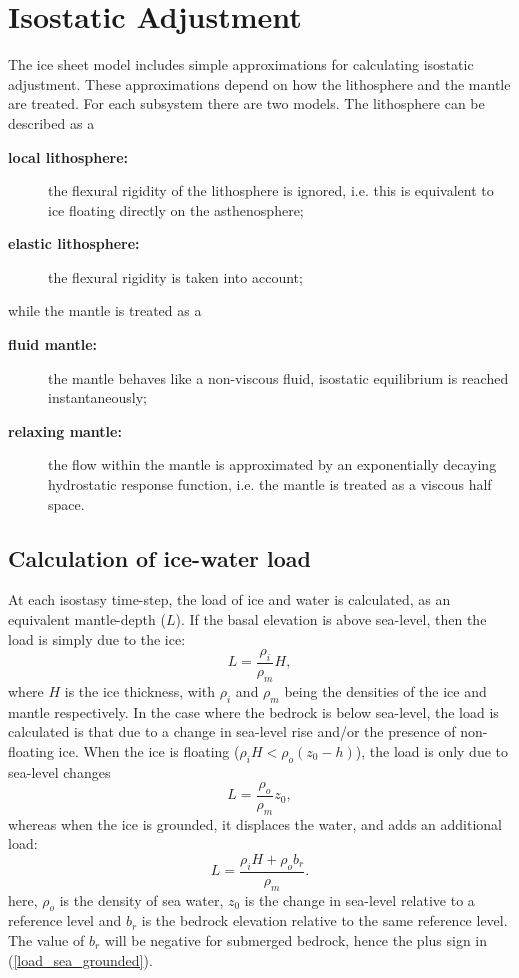 \section{Isostatic Adjustment}
The ice sheet model includes simple approximations for calculating isostatic adjustment. These approximations depend on how the lithosphere and the mantle are treated. For each subsystem there are two models. The lithosphere can be described as a
\begin{description}
\item[\textbf{local lithosphere:}] the flexural rigidity of the lithosphere is ignored, i.e. this is equivalent to ice floating directly on the asthenosphere;
\item[\textbf{elastic lithosphere:}] the flexural rigidity is taken into account;
\end{description}
while the mantle is treated as a
\begin{description}
\item [\textbf{fluid mantle:}] the mantle behaves like a non-viscous fluid, isostatic equilibrium is reached instantaneously;
\item [\textbf{relaxing mantle:}] the flow within the mantle is approximated by an exponentially decaying hydrostatic response function, i.e. the mantle is treated as a viscous half space.
\end{description}

\subsection{Calculation of ice-water load}
At each isostasy time-step, the load of ice and water is calculated, as an
equivalent mantle-depth ($L$). If the basal elevation is above sea-level, then the
load is simply due to the ice:
\begin{equation}
L=\frac{\rho_i}{\rho_m}H,
\label{load_land_ice}
\end{equation}
where $H$ is the ice thickness, with $\rho_i$ and $\rho_m$ being the densities
of the ice and mantle respectively. In the case where the bedrock is below
sea-level, the load is calculated is that due to a change in sea-level rise and/or
the presence of non-floating ice. When the ice is floating ($\rho_i
H<\rho_o(z_0-h)$), the load is only due to sea-level changes
\begin{equation}
L=\frac{\rho_o}{\rho_m}z_0,
\label{load_sea_float}
\end{equation}
whereas when the ice is grounded, it displaces the water, and adds an
additional load:
\begin{equation}
L=\frac{\rho_i H+\rho_o b_r}{\rho_m}.
\label{load_sea_grounded}
\end{equation}
here, $\rho_o$ is the density of sea water, $z_0$ is the change in sea-level
relative to a reference level and $b_r$ is the bedrock elevation relative to the
same reference level. The value of $b_r$ will be negative for submerged bedrock,
hence the plus sign in (\ref{load_sea_grounded}).

